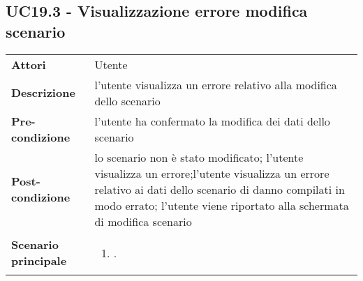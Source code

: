 \subsection{UC19.3 - Visualizzazione errore modifica scenario} 
\label{sssec:UC19.3} 
\def\arraystretch{1.5}
\begin{tabularx}{\textwidth}{l|p{}}
	\rowcolor{I} \multicolumn{2}{c}{\color{white}\textbf{UC19.3 - Visualizzazione errore modifica scenario}} \\
	\toprule
	\endhead
	\textbf{Attori} & Utente\\
	\textbf{Descrizione} & l'utente visualizza un errore relativo alla modifica dello scenario\\
	\textbf{Pre-condizione} & l'utente ha confermato la modifica dei dati dello scenario\\
	\textbf{Post-condizione} & lo scenario non è stato modificato; l'utente visualizza un errore;l'utente visualizza un errore relativo ai dati dello scenario di danno compilati in modo errato; l'utente viene riportato alla schermata di modifica scenario\\
	\textbf{Scenario principale} & \vspace{-1.2em}\begin{enumerate}[leftmargin=*,noitemsep,nosep]
		\item \nameref{sssec:UC19.3}.
	\end{enumerate}\\
	\bottomrule
\end{tabularx}

